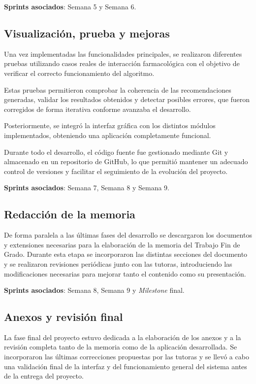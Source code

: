 \textbf{Sprints asociados}: Semana 5 y Semana 6.

\subsection*{Visualización, prueba y mejoras}

Una vez implementadas las funcionalidades principales, se realizaron diferentes pruebas utilizando casos reales de interacción farmacológica con el objetivo de verificar el correcto funcionamiento del algoritmo.

Estas pruebas permitieron comprobar la coherencia de las recomendaciones generadas, validar los resultados obtenidos y detectar posibles errores, que fueron corregidos de forma iterativa conforme avanzaba el desarrollo.

Posteriormente, se integró la interfaz gráfica con los distintos módulos implementados, obteniendo una aplicación completamente funcional.

Durante todo el desarrollo, el código fuente fue gestionado mediante Git y almacenado en un repositorio de GitHub, lo que permitió mantener un adecuado control de versiones y facilitar el seguimiento de la evolución del proyecto.

\textbf{Sprints asociados}: Semana 7, Semana 8 y Semana 9.

\subsection*{Redacción de la memoria}

De forma paralela a las últimas fases del desarrollo se descargaron los documentos y extensiones necesarias para la elaboración de la memoria del Trabajo Fin de Grado. Durante esta etapa se incorporaron las distintas secciones del documento y se realizaron revisiones periódicas junto con las tutoras, introduciendo las modificaciones necesarias para mejorar tanto el contenido como su presentación.

\textbf{Sprints asociados}: Semana 8, Semana 9 y \textit{Milestone} final.

\subsection*{Anexos y revisión final}

La fase final del proyecto estuvo dedicada a la elaboración de los anexos y a la revisión completa tanto de la memoria como de la aplicación desarrollada. Se incorporaron las últimas correcciones propuestas por las tutoras y se llevó a cabo una validación final de la interfaz y del funcionamiento general del sistema antes de la entrega del proyecto.

